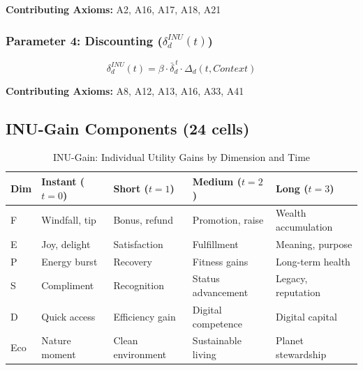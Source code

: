 \textbf{Contributing Axioms:} A2, A16, A17, A18, A21

\subsubsection{Parameter 4: Discounting ($\delta^{INU}_{d}(t)$)}

\begin{tcolorbox}[colback=blue!5!white, colframe=blue!50!black]
\begin{equation}
\boxed{
\delta^{INU}_{d}(t) = \beta \cdot \bar{\delta}_d^{\,t} \cdot \Delta_d(t, Context)
}
\end{equation}
\end{tcolorbox}

\textbf{Contributing Axioms:} A8, A12, A13, A16, A33, A41

\subsection{INU-Gain Components (24 cells)}

\begin{table}[htbp]
\centering
\caption{INU-Gain: Individual Utility Gains by Dimension and Time}
\label{tab:app-c-inu-gain}
\small
\renewcommand{\arraystretch}{1.2}
\begin{tabular}{@{}lp{2.8cm}p{2.8cm}p{2.8cm}p{2.8cm}@{}}
\toprule
\textbf{Dim} & \textbf{Instant ($t=0$)} & \textbf{Short ($t=1$)} & \textbf{Medium ($t=2$)} & \textbf{Long ($t=3$)} \\
\midrule
F & Windfall, tip & Bonus, refund & Promotion, raise & Wealth accumulation \\
E & Joy, delight & Satisfaction & Fulfillment & Meaning, purpose \\
P & Energy burst & Recovery & Fitness gains & Long-term health \\
S & Compliment & Recognition & Status advancement & Legacy, reputation \\
D & Quick access & Efficiency gain & Digital competence & Digital capital \\
Eco & Nature moment & Clean environment & Sustainable living & Planet stewardship \\
\bottomrule
\end{tabular}
\end{table}

